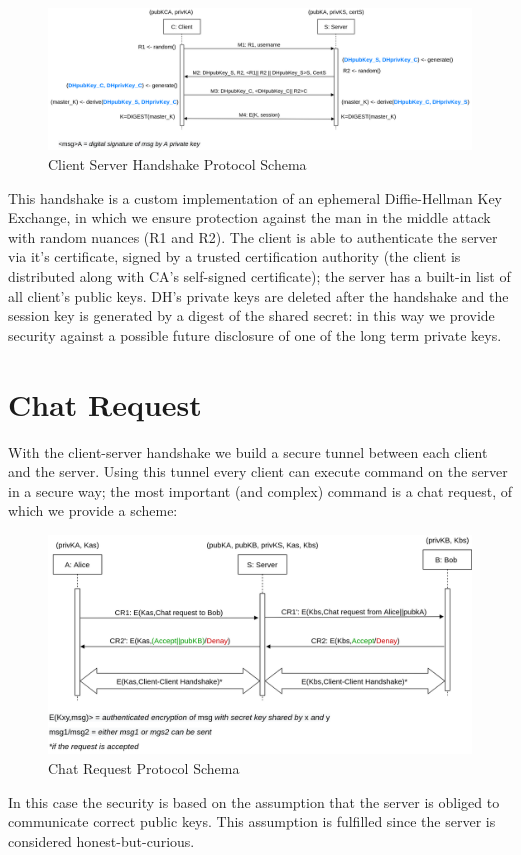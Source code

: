 \documentclass[11pt]{report}
\begin{document}
\begin{figure}[H]
	\centering
	\includegraphics[scale=0.2]{img/AuthClientServer.png}
	\caption{Client Server Handshake Protocol Schema}
	\label {img: AuthClientServer}
\end{figure}

\noindent This handshake is a custom implementation of an ephemeral Diffie-Hellman Key Exchange, in which we ensure
protection against the man in the middle attack with random nuances (R1 and R2). The client is able to 
authenticate the server via it's certificate, signed by a trusted certification authority (the client
is distributed along with CA's self-signed certificate); the server has a built-in list of all client's
public keys. DH's private keys are deleted after the handshake and the session key is generated by a digest of the 
shared secret: in this way we provide security against a possible future disclosure of one of the long term private keys.

\newpage
\section{Chat Request}
With the client-server handshake we build a secure tunnel between each client and the server. Using this 
tunnel every client can execute command on the server in a secure way; the most important (and complex) command
is a chat request, of which we provide a scheme:
\begin{figure}[H]
	\centering
	\includegraphics[scale=0.2]{img/ChatRequest.png}
	\caption{Chat Request Protocol Schema}
	\label {img: ChatRequest}
\end{figure}
\noindent In this case the security is based on the assumption that the server is obliged to communicate correct public keys. This assumption is fulfilled since the server is considered honest-but-curious.
\end{document}
